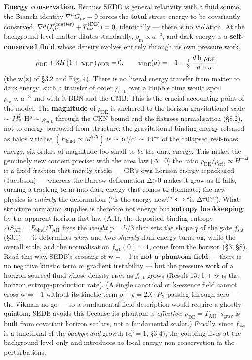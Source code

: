 \documentclass[
  10pt,
]{article}
\begin{document}
\textbf{Energy conservation.} Because SEDE is general relativity with a
fluid source, the Bianchi identity \(\nabla^\mu G_{\mu\nu}=0\) forces
the \textbf{total} stress--energy to be covariantly conserved,
\(\nabla^\mu(T^{(\rm matter)}_{\mu\nu} + T^{(\rm DE)}_{\mu\nu})=0\),
identically --- there is no violation. At the background level matter
dilutes standardly, \(\rho _{\mathrm{m}} \propto  a^{-3}\), and dark
energy is a \textbf{self-conserved fluid} whose density evolves entirely
through its own pressure work,
\[\dot\rho_{\rm DE} + 3H\,(1+w_{\rm DE})\,\rho_{\rm DE} = 0, \qquad
w_{\rm DE}(a) = -1 - \tfrac13\,\frac{d\ln\rho_{\rm DE}}{d\ln a}\] (the
w(z) of §3.2 and Fig. 4). There is no literal energy transfer from
matter to dark energy: such a transfer of order
\(\rho _{\mathrm{crit}}\) over a Hubble time would spoil
\(\rho _{\mathrm{m}} \propto  a^{-3}\) and with it BBN and the CMB. This
is the crucial accounting point of the model. The \textbf{magnitude} of
\(\rho _{\mathrm{DE}}\) is anchored to the horizon gravitational scale ∼
\(M_{\mathrm{P}}^{2}\) H² ∼ \(\rho _{\mathrm{crit}}\) through the CKN
bound and the flatness normalisation (§8.2), not to energy borrowed from
structure: the gravitational binding energy released as halos virialise
\((E_{\mathrm{bind}} \propto  M^{5/3})\) is ∼ σ²/c² ∼ 10⁻⁶ of the
collapsed rest-mass energy, six orders of magnitude too small to
\emph{be} the dark energy. This makes the genuinely new content precise:
with the area law (Δ=0) the ratio
\(\rho _{\mathrm{DE}}/\rho _{\mathrm{crit}} \propto  H^{-\Delta }\) is a
fixed fraction that merely tracks --- GR's own horizon energy repackaged
(Jacobson) --- whereas the Barrow deformation Δ\textgreater0 makes it
grow as H falls, turning a tracking term into dark energy that comes to
dominate; the new physics is \emph{entirely} the deformation (``is the
energy new?'' ⟺ ``is Δ≠0?''). What structure formation supplies is
therefore not energy but \textbf{entropy bookkeeping}: by the
apparent-horizon first law (A.1), the deposited binding entropy
\(\Delta S_{\mathrm{AH}} = E_{\mathrm{bind}}/T_{\mathrm{AH}}\) fixes the
\emph{weight} p = 5/3 that sets the shape γ of the gate
\(f_{\mathrm{sat}}\) (§3.1) --- it determines \emph{when} and \emph{how
sharply} dark energy turns on, while the overall scale, and the
normalisation \(f_{\mathrm{sat}}(0) = 1\), come from the horizon (§3,
§8). Read this way, SEDE's crossing of w = −1 is \textbf{not a phantom
field} --- there is no negative kinetic term or gradient instability ---
but the pressure work of a horizon-sourced fluid whose density rises as
\(f_{\mathrm{sat}}\) grows (Result 13: 1 + w is the horizon
entropy-production rate). (A single canonical or k-essence field cannot
cross w = −1 without its kinetic term
\(\rho  + p = 2X\cdot P_{\mathrm{X}}\) passing through zero --- the
Vikman no-go --- so a fundamental-field description would require a
ghostly quintom; SEDE avoids this because its phantom is
\emph{effective}:
\(\rho _{\mathrm{DE}} = T_{\mathrm{AH}}\cdot s_{\mathrm{grav}}\) is
built from covariant horizon scalars, not a fundamental scalar.)
Finally, since \(f_{\mathrm{sat}}\) is a functional of the
\emph{background} growth \((c_{\mathrm{s}}^{2} = 1\), §3.4), the
coupling lives at the background level only and introduces no local
energy non-conservation in the perturbations.
\end{document}
